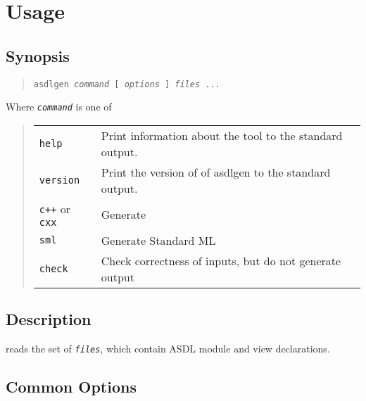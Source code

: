 %
\chapter{Usage}
\label{chap:usage}

\section*{Synopsis}
\begin{quote}
  \texttt{asdlgen \textit{command} [ \textit{options} ] \textit{files} ...}
\end{quote}%
%
Where \texttt{\textit{command}} is one of
\begin{quote}
  \begin{tabular}{ll}
    \texttt{help}
      & Print information about the \asdlgen{} tool to the standard output. \\
    \texttt{version}
      & Print the version of of asdlgen to the standard output. \\
    \texttt{c++} or \texttt{cxx}
      & Generate \Cplusplus{} \\
    \texttt{sml}
      & Generate Standard ML \\
    \texttt{check}
      & Check correctness of inputs, but do not generate output \\
  \end{tabular}%
\end{quote}%

\section*{Description}
\asdlgen{} reads the set of \texttt{\textit{files}}, which contain ASDL module
and view declarations.

\section*{Common Options}

